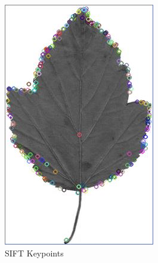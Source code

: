 \documentclass[xcolor=table]{beamer}
\begin{document}
\begin{frame}
\begin{figure}[htbp]
\begin{minipage}[c]{.45\linewidth}
\begin{itemize}
    \end{itemize}
    \end{minipage}
    \hfill
    \begin{minipage}[c]{.45\linewidth}
      \begin{center}
	\includegraphics[scale=0.27]{siftKP.jpg}
	\caption{SIFT Keypoints}
	\label{figure:Illustration}
      \end{center}
    \end{minipage}
  \end{figure}





\end{frame}
\end{document}
